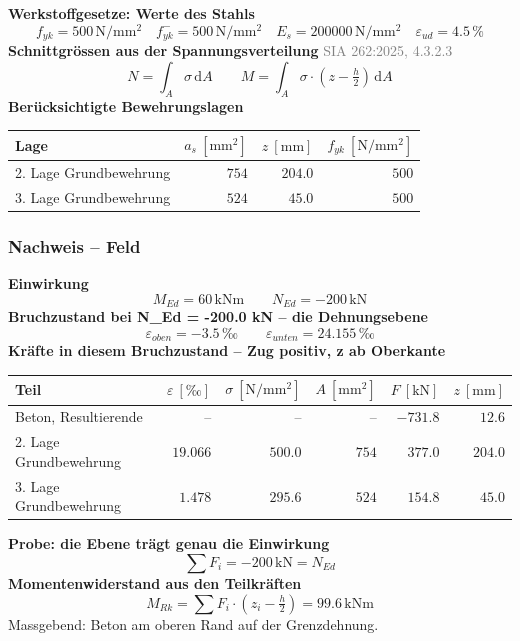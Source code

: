 \documentclass[11pt,a4paper]{article}
\newcommand{\normref}[1]{{\small\textcolor{gray}{#1}}}
\begin{document}
\noindent\textbf{Werkstoffgesetze: Werte des Stahls}
\begin{equation*}
f_{yk} = 500\,\mathrm{N}/\mathrm{mm}^{2} \quad f_{yk}^{-} = 500\,\mathrm{N}/\mathrm{mm}^{2} \quad E_s = 200000\,\mathrm{N}/\mathrm{mm}^{2} \quad \varepsilon_{ud} = 4.5\,\%
\end{equation*}
\noindent\textbf{Schnittgrössen aus der Spannungsverteilung} \hfill \normref{SIA 262:2025, 4.3.2.3}
\begin{equation*}
N = \int_A \sigma\,\mathrm{d}A \qquad M = \int_A \sigma \cdot \left(z - \tfrac{h}{2}\right)\,\mathrm{d}A
\end{equation*}
\noindent\textbf{Berücksichtigte Bewehrungslagen}
\begin{longtable}{lrrr}
\hline
Lage & $a_s\ [\mathrm{mm}^2]$ & $z\ [\mathrm{mm}]$ & $f_{yk}\ [\mathrm{N/mm^2}]$ \\
\hline
\endhead
2. Lage Grundbewehrung & $754$ & $204.0$ & $500$ \\
3. Lage Grundbewehrung & $524$ & $45.0$ & $500$ \\
\hline
\end{longtable}
\subsubsection{Nachweis – Feld}
\noindent\textbf{Einwirkung}
\begin{equation*}
M_{Ed} = 60\,\mathrm{kNm} \qquad N_{Ed} = -200\,\mathrm{kN}
\end{equation*}
\noindent\textbf{Bruchzustand bei N\_Ed = -200.0 kN – die Dehnungsebene}
\begin{equation*}
\varepsilon_{oben} = -3.5\,\text{‰} \qquad \varepsilon_{unten} = 24.155\,\text{‰}
\end{equation*}
\noindent\textbf{Kräfte in diesem Bruchzustand – Zug positiv, z ab Oberkante}
\begin{longtable}{lrrrrr}
\hline
Teil & $\varepsilon\ [‰]$ & $\sigma\ [\mathrm{N/mm^2}]$ & $A\ [\mathrm{mm}^2]$ & $F\ [\mathrm{kN}]$ & $z\ [\mathrm{mm}]$ \\
\hline
\endhead
Beton, Resultierende & $–$ & $–$ & $–$ & $-731.8$ & $12.6$ \\
2. Lage Grundbewehrung & $19.066$ & $500.0$ & $754$ & $377.0$ & $204.0$ \\
3. Lage Grundbewehrung & $1.478$ & $295.6$ & $524$ & $154.8$ & $45.0$ \\
\hline
\end{longtable}
\noindent\textbf{Probe: die Ebene trägt genau die Einwirkung}
\begin{equation*}
\sum F_i = -200\,\mathrm{kN} = N_{Ed}
\end{equation*}
\noindent\textbf{Momentenwiderstand aus den Teilkräften}
\begin{equation*}
M_{Rk} = \sum F_i \cdot \left(z_i - \tfrac{h}{2}\right) = 99.6\,\mathrm{kNm}
\end{equation*}
Massgebend: Beton am oberen Rand auf der Grenzdehnung.
\end{document}

